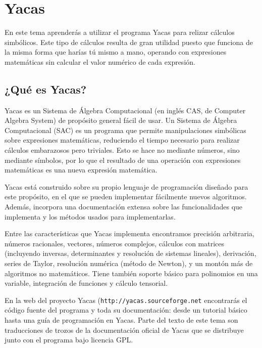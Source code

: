 
\chapter{Yacas}
\label{yacas.tex}


En  este tema  aprenderás a  utilizar el  programa Yacas  para relizar
cálculos simbólicos.  Este tipo de  cálculos resulta de  gran utilidad
puesto que  funciona de  la misma  forma que harías  tú mismo  a mano,
operando con expresiones matemáticas sin calcular el valor numérico de
cada expresión. 



\section{¿Qué es Yacas?}

Yacas  es un  Sistema  de  Álgebra Computacional  (en  inglés CAS,  de
Computer  Algebra  System) de  propósito  general  fácil de  usar.  Un
Sistema  de Álgebra  Computacional (SAC)  es un  programa que  permite
manipulaciones simbólicas sobre expresiones matemáticas, reduciendo el
tiempo necesario  para realizar  cálculos embarazosos  pero triviales.
Esto se hace  no mediante números, sino mediante símbolos,  por lo que
el resultado de una operación con expresiones matemáticas es una nueva
expresión matemática.

Yacas  está  construido  sobre  su  propio  lenguaje  de  programación
diseñado  para  este  propósito,  en  el  que  se  pueden  implementar
fácilmente  nuevos  algoritmos.  Además, incorpora  una  documentación
extensa sobre las funcionalidades que  implementa y los métodos usados
para implementarlas.

Entre las  características que Yacas implementa  encontramos precisión
arbitraria, números racionales,  vectores, números complejos, cálculos
con  matrices  (incluyendo  inversas, determinantes  y  resolución  de
sistemas lineales), derivación, series  de Taylor, resolución numérica
(método  de Newton),  y un  montón más  de algoritmos  no matemáticos.
Tiene  también  soporte  básico   para  polinomios  en  una  variable,
integración de funciones y cálculo tensorial.

En  la  web  del proyecto  Yacas  ({\tt  http://yacas.sourceforge.net}
encontrarás el  código fuente  del programa  y toda  su documentación:
desde  un tutorial  básico hasta  una guía  de programación  en Yacas.
Parte  del  texto de  este  tema  son  traducciones  de trozos  de  la
documentación oficial de Yacas que se distribuye junto con el programa
bajo licencia GPL.



